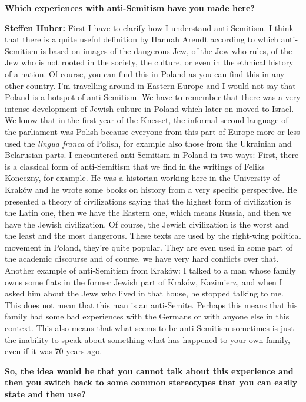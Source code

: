 \textbf{Which experiences with anti-Semitism have you made here? } 

\textbf{Steffen Huber:} First I have to clarify how I understand anti-Semitism. I think that there is a quite useful definition by Hannah Arendt according to which anti-Semitism is based on images of the dangerous Jew, of the Jew who rules, of the Jew who is not rooted in the society, the culture, or even in the ethnical history of a nation. Of course, you can find this in Poland as you can find this in any other country. I'm travelling around in Eastern Europe and I would not say that Poland is a hotspot of anti-Semitism. We have to remember that there was a very intense development of Jewish culture in Poland which later on moved to Israel. We know that in the first year of the Knesset, the informal second language of the parliament was Polish because everyone from this part of Europe more or less used the \textit{lingua franca} of Polish, for example also those from the Ukrainian and Belarusian parts. I encountered anti-Semitism in Poland in two ways: First, there is a classical form of anti-Semitism that we find in the writings of Feliks Koneczny, for example. He was a historian working here in the University of Kraków and he wrote some books on history from a very specific perspective. He presented a theory of civilizations saying that the highest form of civilization is the Latin one, then we have the Eastern one, which means Russia, and then we have the Jewish civilization. Of course, the Jewish civilization is the worst and the least and the most dangerous. These texts are used by the right-wing political movement in Poland, they're quite popular. They are even used in some part of the academic discourse and of course, we have very hard conflicts over that.\\
Another example of anti-Semitism from Kraków: I talked to a man whose family owns some flats in the former Jewish part of Kraków, Kazimierz, and when I asked him about the Jews who lived in that house, he stopped talking to me. This does not mean that this man is an anti-Semite. Perhaps this means that his family had some bad experiences with the Germans or with anyone else in this context. This also means that what seems to be anti-Semitism sometimes is just the inability to speak about something what has happened to your own family, even if it was 70 years ago.

\textbf{So, the idea would be that you cannot talk about this experience and then you switch back to some common stereotypes that you can easily state and then use?} 

